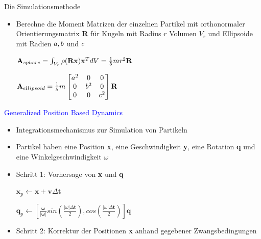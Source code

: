 \documentclass[t]{beamer}
\begin{document}
	\begin{frame}{Die Simulationsmethode}
		\begin{itemize}
			\item Berechne die Moment Matrizen der einzelnen Partikel mit orthonormaler Orientierungsmatrix \textbf{R} für Kugeln mit Radius $r$ Volumen $V_r$ und Ellipsoide mit Radien $\mathnormal{a, b}$ und $\mathnormal{c}$ 
					\begin{center}
						$\mathnormal{\mathbf{A}_{sphere}}= \int_{V_r}\rho(\mathbf{Rx})\mathbf{x}^T dV = \frac{1}{5}mr^2\mathbf{R}$
					\end{center}
					\begin{center}	
						$\mathnormal{\mathbf{A}_{ellipsoid}}= \frac{1}{5}m
						\begin{bmatrix}
						a^2& 0& 0 \\
						0& b^2& 0 \\
						0& 0& c^2
						\end{bmatrix}\mathbf{R}$
					\end{center}
		\end{itemize}
	\end{frame}
	
	\begin{frame}
		\textcolor{blue}{Generalized Position Based Dynamics}
		\begin{itemize}
			\item Integrationsmechanismus zur Simulation von Partikeln
			\item Partikel haben eine Position \textbf{x}, eine Geschwindigkeit \textbf{y}, eine Rotation \textbf{q} und eine Winkelgeschwindigkeit $\omega$
			\item Schritt 1: Vorhersage von \textbf{x} und \textbf{q}
					\begin{center}
						$\mathbf{x}_p \leftarrow \mathbf{x}+\mathbf{v}\Delta \mathbf{t}$
					\end{center}
					\begin{center}
						$\mathbf{q}_p \leftarrow [\frac{\mathbf{\omega}}{\vert \mathbf{\omega \vert}} sin(\frac{\vert \omega \vert \Delta \mathbf{t}}{2}), cos(\frac{\vert \omega \vert \Delta \mathbf{t}}{2})]\mathbf{q}$
					\end{center}
			\item Schritt 2: Korrektur der Positionen \textbf{x} anhand gegebener Zwangsbedingungen
		\end{itemize}
	\end{frame}
	
\end{document}
